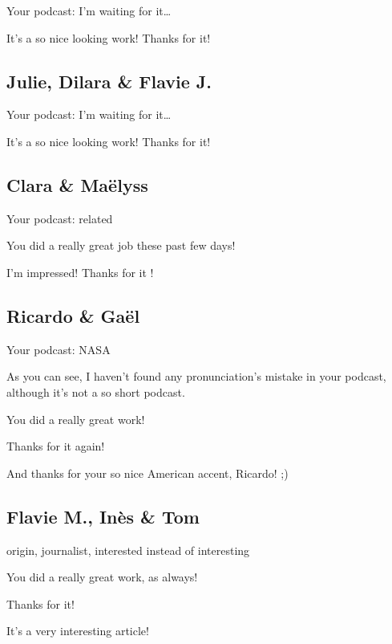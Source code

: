 \documentclass[12pt,oneside]{report}
\begin{document}
\begin{spacing}{1.2}
Your podcast: I'm waiting for it\dots

\color{blue}
It's a so nice looking work! Thanks for it!
\color{black}

\subsection*{Julie, Dilara \& Flavie J.}

Your podcast: I'm waiting for it\dots

\color{blue}
It's a so nice looking work! Thanks for it!
\color{black}

\subsection*{Clara \& Maëlyss}

Your podcast: related

\color{blue}
You did a really great job these past few days!

I'm impressed! Thanks for it !
\color{black}

\subsection*{Ricardo \& Gaël}

Your podcast: NASA

\color{blue}
As you can see, I haven't found any pronunciation's mistake in your podcast, although it's not a so short podcast.

You did a really great work!

Thanks for it again!

And thanks for your so nice American accent, Ricardo! ;)
\color{black}

\subsection*{Flavie M., Inès \& Tom}

origin, journalist, \og interested\fg{} instead of \og interesting \fg{}

\color{blue}
You did a really great work, as always!

Thanks for it!

It's a very interesting article!
\color{black}


\end{spacing}
\end{document}
